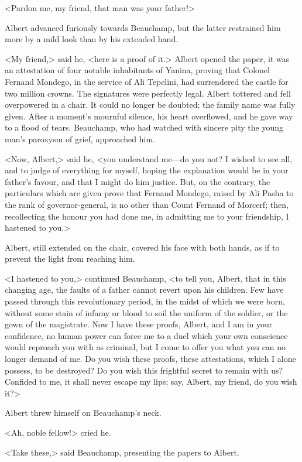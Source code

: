  <Pardon me, my friend, that man was your father!> 

 Albert advanced furiously towards Beauchamp, but the latter restrained him more by a mild look than by his extended hand. 

 <My friend,> said he, <here is a proof of it.>  Albert opened the paper, it was an attestation of four notable inhabitants of Yanina, proving that Colonel Fernand Mondego, in the service of Ali Tepelini, had surrendered the castle for two million crowns. The signatures were perfectly legal. Albert tottered and fell overpowered in a chair. It could no longer be doubted; the family name was fully given. After a moment's mournful silence, his heart overflowed, and he gave way to a flood of tears. Beauchamp, who had watched with sincere pity the young man's paroxysm of grief, approached him. 

 <Now, Albert,> said he, <you understand me—do you not? I wished to see all, and to judge of everything for myself, hoping the explanation would be in your father's favour, and that I might do him justice. But, on the contrary, the particulars which are given prove that Fernand Mondego, raised by Ali Pasha to the rank of governor-general, is no other than Count Fernand of Morcerf; then, recollecting the honour you had done me, in admitting me to your friendship, I hastened to you.> 

 Albert, still extended on the chair, covered his face with both hands, as if to prevent the light from reaching him. 

 <I hastened to you,> continued Beauchamp, <to tell you, Albert, that in this changing age, the faults of a father cannot revert upon his children. Few have passed through this revolutionary period, in the midst of which we were born, without some stain of infamy or blood to soil the uniform of the soldier, or the gown of the magistrate. Now I have these proofs, Albert, and I am in your confidence, no human power can force me to a duel which your own conscience would reproach you with as criminal, but I come to offer you what you can no longer demand of me. Do you wish these proofs, these attestations, which I alone possess, to be destroyed? Do you wish this frightful secret to remain with us? Confided to me, it shall never escape my lips; say, Albert, my friend, do you wish it?> 

 Albert threw himself on Beauchamp's neck. 

 <Ah, noble fellow!> cried he. 

 <Take these,> said Beauchamp, presenting the papers to Albert. 

